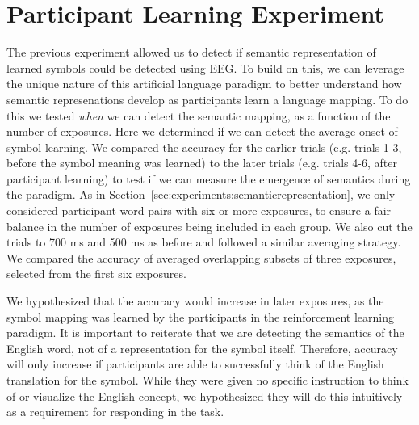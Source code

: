 \section{Participant Learning Experiment}
\label{sec:experiments:participantlearning}
The previous experiment allowed us to detect if semantic representation of 
learned symbols could be detected using EEG. To build on this, we can leverage 
the unique nature of this artificial language paradigm to better understand how 
semantic represenations develop as participants learn a language mapping. To do 
this we tested \emph{when} we can detect the semantic mapping, as a function of 
the number of exposures.  Here we determined if we can detect the average onset 
of symbol learning. We compared the \tvt accuracy for the earlier trials (e.g.  
trials 1-3, before the symbol meaning was learned) to the later trials (e.g.  
trials 4-6, after participant learning) to test if we can measure the emergence 
of semantics during the paradigm. As in 
Section~\ref{sec:experiments:semanticrepresentation}, we only considered 
participant-word pairs with six or more exposures, to ensure a fair balance in 
the number of exposures being included in each group. We also cut the trials to 
700 ms and 500 ms as before and followed a similar averaging strategy. We 
compared the \tvt accuracy of averaged overlapping subsets of three exposures, 
selected from the first six exposures.

We hypothesized that the \tvt accuracy would increase in later exposures, as 
the symbol mapping was learned by the participants in the reinforcement 
learning paradigm. It is important to reiterate that we are detecting the 
semantics of the English word, not of a representation for the symbol itself.  
Therefore, accuracy will only increase if participants are able to successfully 
think of the English translation for the symbol. While they were given no 
specific instruction to think of or visualize the English concept, we 
hypothesized they will do this intuitively as a requirement for responding in 
the task.
